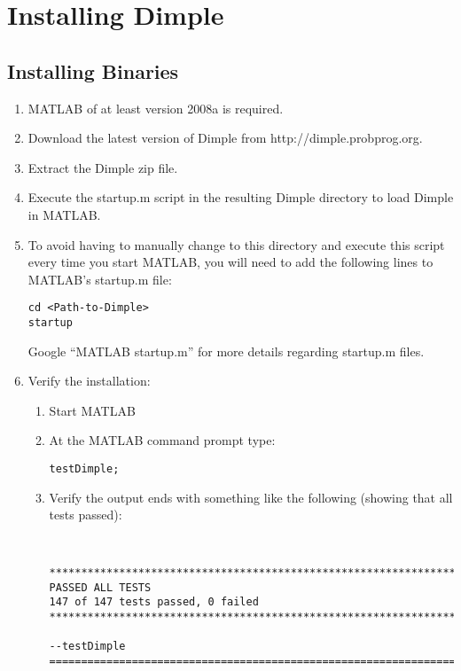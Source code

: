 \section{Installing Dimple}


\subsection{Installing Binaries}

\ifmatlab

\begin{enumerate}
\item MATLAB of at least version 2008a is required. 
\item Download the latest version of Dimple from http://dimple.probprog.org.
\item Extract the Dimple zip file.
\item Execute the startup.m script in the resulting Dimple directory to 
load Dimple in MATLAB.
\item To avoid having to manually change to this directory and execute 
this script every time you start MATLAB, you will need to add the following lines to MATLAB's startup.m file:
\begin{lstlisting}
cd <Path-to-Dimple>
startup
\end{lstlisting}
Google ``MATLAB startup.m'' for more details regarding startup.m files.
\item Verify the installation:
\begin{enumerate}
\item Start MATLAB
\item  At the MATLAB command prompt type:
\begin{lstlisting} 
testDimple;
\end{lstlisting}
\item Verify the output ends with something like the following (showing that all tests passed): \\
\begin{minipage}{\textwidth}
\begin{lstlisting} 


**********************************************************************
PASSED ALL TESTS
147 of 147 tests passed, 0 failed
**********************************************************************

--testDimple
======================================================================
\end{lstlisting}
\end{minipage}

\end{enumerate}
\end{enumerate}

